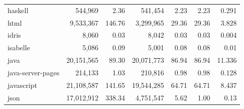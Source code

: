 \documentclass[10pt]{article} %
\begin{document}
\begin{table}[t]
{\begin{tabular}{@{\extracolsep{3pt}}lrrrrrr@{}}
haskell                  & 544,969                                   & 2.36                                   & 541,454                                                & 2.23                                                & 2.23                       & 0.291                          \\
html                     & 9,533,367                                 & 146.76                                 & 3,299,965                                              & 29.36                                               & 29.36                      & 3.828                          \\
idris                    & 8,060                                     & 0.03                                   & 8,042                                                  & 0.03                                                & 0.03                       & 0.004                          \\
isabelle                 & 5,086                                     & 0.09                                   & 5,001                                                  & 0.08                                                & 0.08                       & 0.01                           \\
java                     & 20,151,565                                & 89.30                                  & 20,071,773                                             & 86.94                                               & 86.94                      & 11.336                         \\
java-server-pages        & 214,133                                   & 1.03                                   & 210,816                                                & 0.98                                                & 0.98                       & 0.128                          \\
javascript               & 21,108,587                                & 141.65                                 & 19,544,285                                             & 64.71                                               & 64.71                      & 8.437                          \\
json                     & 17,012,912                                & 338.34                                 & 4,751,547                                              & 5.62                                                & 1.00                       & 0.13                           \\

\end{tabular}}
\end{table}
\end{document}

